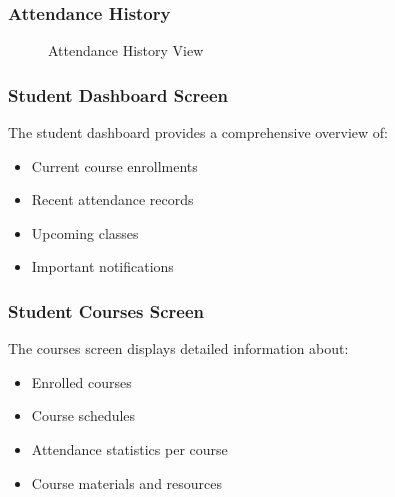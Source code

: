 \subsubsection{Attendance History}
\begin{figure}[H]
    \centering
    \caption{Attendance History View}
    \label{fig:attendance_history}
\end{figure}

\subsubsection{Student Dashboard Screen}
The student dashboard provides a comprehensive overview of:
\begin{itemize}
    \item Current course enrollments
    \item Recent attendance records
    \item Upcoming classes
    \item Important notifications
\end{itemize}

\subsubsection{Student Courses Screen}
The courses screen displays detailed information about:
\begin{itemize}
    \item Enrolled courses
    \item Course schedules
    \item Attendance statistics per course
    \item Course materials and resources
\end{itemize}

